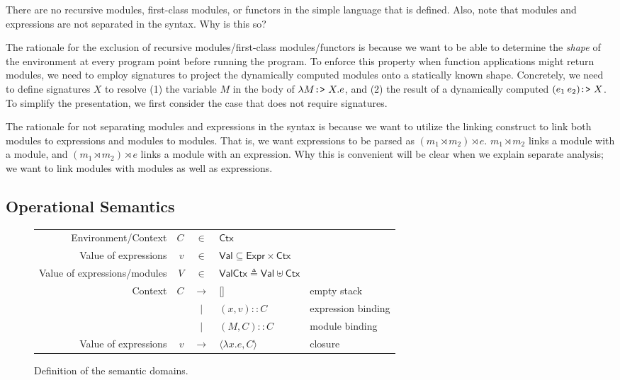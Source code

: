 \documentclass[acmsmall,review]{acmart}\settopmatter{printfolios=true,printccs=false,printacmref=false}
\theoremstyle{definition}
\theoremstyle{plain}
\newcommand*{\vbar}{|}
\newcommand*{\cons}{::}
\newcommand*{\Expr}{\mathsf{Expr}}
\newcommand*{\Ctx}{\mathsf{Ctx}}
\newcommand*{\Value}{\mathsf{Val}}
\newcommand*{\link}[2]{{#1}\rtimes{#2}}
\newcommand*{\project}{\text{\texttt{:>} }}
\begin{document}
There are no recursive modules, first-class modules, or functors in the simple language that is defined.
Also, note that modules and expressions are not separated in the syntax.
Why is this so?

The rationale for the exclusion of recursive modules/first-class modules/functors is because we want to be able to determine the \emph{shape} of the environment at every program point before running the program.
To enforce this property when function applications might return modules, we need to employ signatures to project the dynamically computed modules onto a statically known shape.
Concretely, we need to define signatures $X$ to resolve (1) the variable $M$ in the body of $\lambda M\project X.e$, and (2) the result of a dynamically computed $(e_1\:e_2)\project X$.
To simplify the presentation, we first consider the case that does not require signatures.

The rationale for not separating modules and expressions in the syntax is because we want to utilize the linking construct to link both modules to expressions and modules to modules.
That is, we want expressions to be parsed as $\link{(\link{m_1}{m_2})}{e}$.
$\link{m_1}{m_2}$ links a module with a module, and $\link{(\link{m_1}{m_2})}{e}$ links a module with an expression.
Why this is convenient will be clear when we explain separate analysis; we want to link modules with modules as well as expressions.

\subsection{Operational Semantics}
\begin{figure}[h!]
  \centering
  \begin{tabular}{rrcll}
    Environment/Context          & $C$ & $\in$         & $\Ctx$                                                      \\
    Value of expressions         & $v$ & $\in$         & $\Value \subseteq \Expr\times\Ctx$                          \\
    Value of expressions/modules & $V$ & $\in$         & $\Value\Ctx\triangleq\Value\uplus\Ctx$                      \\
    Context                      & $C$ & $\rightarrow$ & []                                     & empty stack        \\
                                 &     & $\vbar$       & $(x,v)\cons C$                         & expression binding \\
                                 &     & $\vbar$       & $(M,C)\cons C$                         & module binding     \\
    Value of expressions         & $v$ & $\rightarrow$ & $\langle \lambda x.e, C \rangle$       & closure
  \end{tabular}
  \caption{Definition of the semantic domains.}
  \label{fig:simpdom}
\end{figure}
\end{document}
